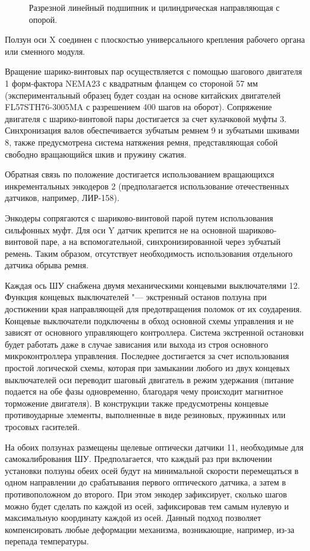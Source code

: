 \begin{figure}[ht]
	\caption{Разрезной линейный подшипник и цилиндрическая направляющая с опорой.}\label{fig:bearing}
\end{figure}

Ползун оси X соединен с плоскостью универсального крепления рабочего органа или сменного модуля.

Вращение шарико-винтовых пар осуществляется с помощью шагового двигателя 1 форм-фактора NEMA23 с квадратным фланцем со стороной 57 мм (экспериментальный образец будет создан на основе китайских двигателей FL57STH76-3005MA с разрешением 400 шагов на оборот). Сопряжение двигателя с шарико-винтовой пары достигается за счет кулачковой муфты 3. Синхронизация валов обеспечивается зубчатым ремнем 9 и зубчатыми шкивами 8, также предусмотрена система натяжения ремня, представляющая собой свободно вращающийся шкив и пружину сжатия.

Обратная связь по положение достигается использованием вращающихся инкрементальных энкодеров 2 (предполагается использование отечественных датчиков, например, ЛИР-158).

Энкодеры сопрягаются с шариково-винтовой парой путем использования сильфонных муфт. Для оси Y датчик крепится не на основной шариково-винтовой паре, а на вспомогательной, синхронизированной через зубчатый ремень. Таким образом, отсутствует необходимость использования отдельного датчика обрыва ремня. 

Каждая ось ШУ снабжена двумя механическими концевыми выключателями 12. Функция концевых выключателей "--- экстренный останов ползуна при достижении края направляющей для предотвращения поломок от их соударения. Концевые выключатели подключены в обход основной схемы управления и не зависят от основного управляющего контроллера. Система экстренной остановки будет работать даже в случае зависания или выхода из строя основного микроконтроллера управления. Последнее достигается за счет использования простой логической схемы, которая при замыкании любого из двух концевых выключателей оси переводит шаговый двигатель в режим удержания (питание подается на обе фазы одновременно, благодаря чему происходит магнитное торможение двигателя). В конструкции также предусмотрены концевые противоударные элементы, выполненные в виде резиновых, пружинных или тросовых гасителей.

На обоих ползунах размещены щелевые оптически датчики 11, необходимые для самокалибрования ШУ. Предполагается, что каждый раз при включении установки ползуны обеих осей будут на минимальной скорости перемещаться в одном направлении до срабатывания первого оптического датчика, а затем в противоположном до второго. При этом энкодер зафиксирует, сколько шагов можно будет сделать по каждой из осей, зафиксировав тем самым нулевую и максимальную координату каждой из осей. Данный подход позволяет компенсировать любые деформации механизма, возникающие, например, из-за перепада температуры.

